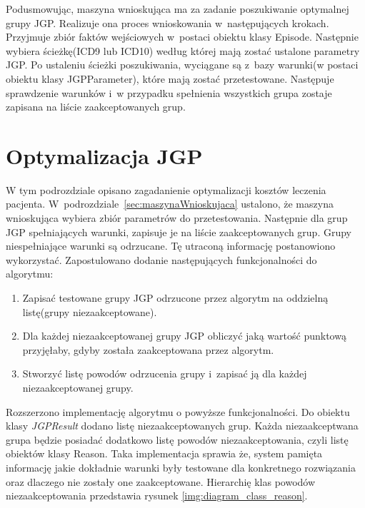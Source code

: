 Podusmowując, maszyna wnioskująca ma za zadanie poszukiwanie optymalnej grupy JGP. Realizuje ona proces wnioskowania w~następujących krokach. Przyjmuje zbiór faktów wejściowych w~postaci obiektu klasy Episode. Następnie wybiera ścieżkę(ICD9 lub ICD10) według której mają zostać ustalone parametry JGP. Po ustaleniu ścieżki poszukiwania, wyciągane są z~bazy warunki(w postaci obiektu klasy JGPParameter), które mają zostać przetestowane. Następuje sprawdzenie warunków i~w przypadku spełnienia wszystkich grupa zostaje zapisana na liście zaakceptowanych grup.


\section{Optymalizacja JGP}
\label{sec:optymalizacjaJGP}

W tym podrozdziale opisano zagadanienie optymalizacji kosztów leczenia pacjenta. W~podrozdziale~\ref{sec:maszynaWnioskujaca} ustalono, że maszyna wnioskująca wybiera zbiór parametrów do przetestowania. Następnie dla grup JGP spełniających warunki, zapisuje je na liście zaakceptowanych grup.
Grupy niespełniające warunki są odrzucane. Tę utraconą informację postanowiono wykorzystać. Zapostulowano dodanie następujących funkcjonalności do algorytmu:
\begin{enumerate}
 \item Zapisać testowane grupy JGP odrzucone przez algorytm na oddzielną listę(grupy niezaakceptowane).
 \item Dla każdej niezaakceptowanej grupy JGP obliczyć jaką wartość punktową przyjęłaby, gdyby została zaakceptowana przez algorytm.
 \item Stworzyć listę powodów odrzucenia grupy i~zapisać ją dla każdej niezaakceptowanej grupy.
\end{enumerate}

Rozszerzono implementację algorytmu o powyższe funkcjonalności. Do obiektu klasy \textit{JGPResult} dodano listę niezaakceptowanych grup. Każda niezaakceptwana grupa będzie posiadać dodatkowo listę powodów niezaakceptowania, czyli listę obiektów klasy Reason. 
Taka implementacja sprawia że, system pamięta informację jakie dokładnie warunki były testowane dla konkretnego rozwiązania oraz dlaczego nie zostały one zaakceptowane. Hierarchię klas powodów niezaakceptowania przedstawia rysunek \ref{img:diagram_class_reason}.

